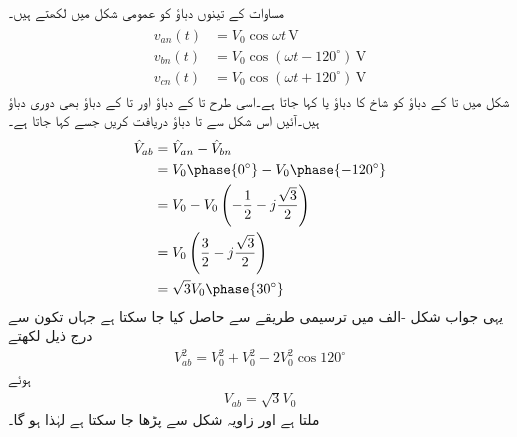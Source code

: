 مساوات  کے تینوں دباؤ کو عمومی شکل میں لکھتے ہیں۔
\begin{gather}
\begin{aligned}
v_{an}(t)&=V_0 \cos\omega t \,\si{\volt}\\
v_{bn}(t)&=V_0 \cos(\omega t-120^{\circ})\,\si{\volt}\\
v_{cn}(t)&=V_0 \cos(\omega t +120^{\circ})\,\si{\volt}
\end{aligned}
\end{gather}
شکل  میں  تا  کے دباؤ  کو شاخ کا دباؤ یا  کہا جاتا ہے۔اسی طرح   تا  کے دباؤ  اور   تا  کے دباؤ  بھی دوری دباؤ ہیں۔آئیں اس شکل سے  تا  دباؤ دریافت کریں جسے  کہا جاتا ہے۔
\begin{align*}
\hat{V}_{ab}&=\hat{V}_{an}-\hat{V}_{bn}\\
&=V_0\phase{0^{\circ}}-V_0\phase{-120^{\circ}}\\
&=V_0-V_0\left(-\frac{1}{2}-j\frac{\sqrt{3}}{2}\right)\\
&=V_0\left(\frac{3}{2}-j\frac{\sqrt{3}}{2}\right)\\
&=\sqrt{3}V_0\phase{30^{\circ}}
\end{align*}
یہی جواب شکل -الف میں ترسیمی طریقے سے حاصل کیا جا سکتا ہے جہاں تکون سے درج ذیل لکھتے
\begin{align*}
V^2_{ab}=V^2_0+V^2_0-2V^2_0\cos 120^{\circ}
\end{align*}
ہوئے
\begin{align}
V_{ab}=\sqrt{3}V_0
\end{align}
ملتا ہے اور زاویہ شکل سے  پڑھا جا سکتا ہے لہٰذا  ہو گا۔

